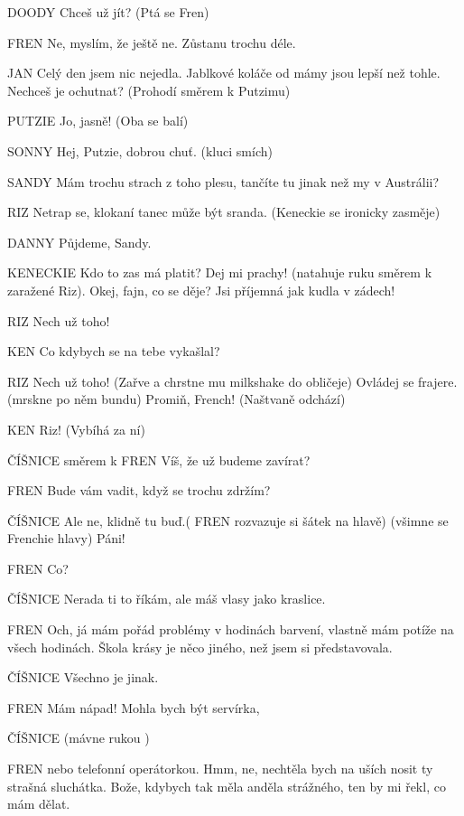 DOODY        Chceš už jít? (Ptá se Fren)

FREN        Ne, myslím, že ještě ne. Zůstanu trochu déle. 

JAN        Celý den jsem nic nejedla. Jablkové koláče od mámy jsou lepší než                 tohle. Nechceš je ochutnat? (Prohodí směrem k Putzimu) 

PUTZIE         Jo, jasně! (Oba se balí) 

SONNY        Hej, Putzie, dobrou chuť. (kluci smích)

SANDY        Mám trochu strach z toho plesu, tančíte tu jinak než my v Austrálii? 

RIZ                Netrap se, klokaní tanec může být sranda. (Keneckie se ironicky                 zasměje) 

DANNY        Půjdeme, Sandy. 

KENECKIE        Kdo to zas má platit? Dej mi prachy! (natahuje ruku směrem k zaražené         Riz). Okej, fajn, co se děje? Jsi příjemná jak kudla v zádech! 

RIZ                Nech už toho! 

KEN        Co kdybych se na tebe vykašlal? 

RIZ                Nech už toho! (Zařve a chrstne mu milkshake do obličeje) Ovládej se         frajere. (mrskne po něm bundu) Promiň, French! (Naštvaně odchází)

KEN         Riz! (Vybíhá za ní) 

ČÍŠNICE          směrem k FREN  Víš, že už budeme zavírat? 

FREN        Bude vám vadit, když se trochu zdržím?

ČÍŠNICE         Ale ne, klidně tu buď.( FREN rozvazuje si šátek na hlavě) (všimne se         Frenchie hlavy) Páni! 

FREN        Co? 

ČÍŠNICE        Nerada ti to říkám, ale máš vlasy jako kraslice. 

FREN        Och, já mám pořád problémy v hodinách barvení, vlastně mám potíže         na všech hodinách. Škola krásy je něco jiného, než jsem si                         představovala. 

ČÍŠNICE         Všechno je jinak.

FREN        Mám nápad! Mohla bych být servírka,

ČÍŠNICE        (mávne rukou ) 

FREN        nebo telefonní operátorkou. Hmm, ne, nechtěla bych na uších nosit ty         strašná sluchátka. Bože, kdybych tak měla anděla strážného, ten by mi         řekl, co mám dělat. 

